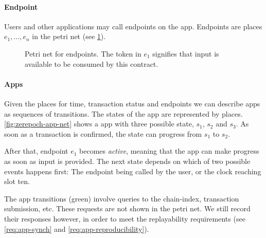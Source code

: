 \paragraph{Endpoint}

Users and other applications may call endpoints on the \gls{app}.
Endpoints are places $e_1, \ldots, e_n$ in the petri net (see \ref{fig:petri-net-endpoint}).

\begin{figure}
  \centering
\caption{Petri net for endpoints. The token in $e_1$ signifies that input is available to be consumed by this contract.}
\label{fig:petri-net-endpoint}
\end{figure}

\paragraph{Apps}

Given the places for time, transaction status and endpoints we can describe \glspl{app} as sequences of transitions.
The states of the app are represented by places.
\ref{fig:zerepoch-app-net} shows a \gls{app} with three possible state, $s_1$, $s_2$ and $s_3$.
As soon as a transaction is confirmed, the state can progress from $s_1$ to $s_2$.

After that, endpoint $e_1$ becomes \emph{active}, meaning that the app can make progress as soon as input is provided. The next state depends on which of two possible events happens first: The endpoint being called by the user, or the clock reaching slot ten.

The app transitions (green) involve queries to the \gls{chain-index}, transaction submission, etc.
These requests are not shown in the petri net.
We still record their responses however, in order to meet the replayability requirements (see \ref{req:app-synch} and \ref{req:app-reproducibility}).

